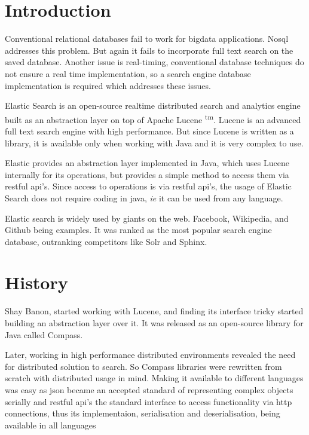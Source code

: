\documentclass[12pt]{article}
\begin{document}
	\tableofcontents
	\listoffigures
	\newpage
	\printacronyms[include-classes=abbrev,name=Abbreviations]
	\newpage


	\renewcommand{\abstractname}{\Large Abstract}
	
	\newpage

	\section{Introduction}
		Conventional relational databases fail to work for bigdata applications. No\ac{sql} addresses this problem. But again it fails to incorporate full text search on the saved database. Another issue is real-timing, conventional database techniques do not ensure a real time implementation, so a search engine database implementation is required which addresses these issues.\cite{mine}

		Elastic Search is an open-source realtime distributed search and analytics engine built as an abstraction layer on top of Apache Lucene \textsuperscript{\ac{tm}}\cite{book}. Lucene is an advanced full text search engine with high performance\cite{lucenesite}. But since Lucene is written as a library, it is available only when working with Java and it is very complex to use.

		Elastic provides an abstraction layer implemented in Java, which uses Lucene internally for its operations, but provides a simple method to access them via \ac{rest}ful \ac{api}'s. Since access to operations is via \ac{rest}ful \ac{api}'s, the usage of Elastic Search does not require coding in java, \emph{ie} it can be used from any language.

		Elastic search is widely used by giants on the web. Facebook, Wikipedia, and Github being examples. It was ranked as the most popular search engine database, outranking competitors like Solr and Sphinx.\cite{dbranking}

	\section{History}
		Shay Banon, started working with Lucene, and finding its interface tricky started building an abstraction layer over it. It was released as an open-source library for Java called Compass.\cite{site}

		Later, working in high performance distributed environments revealed the need for distributed solution to search. So Compass libraries were rewritten from scratch with distributed usage in mind. Making it available to different languages was easy as \ac{json} became an accepted standard of representing complex objects serially and \ac{rest}ful \ac{api}'s the standard interface to access functionality via \ac{http} connections, thus its implementaion, serialisation and deserialisation, being available in all languages
	
\end{document}

